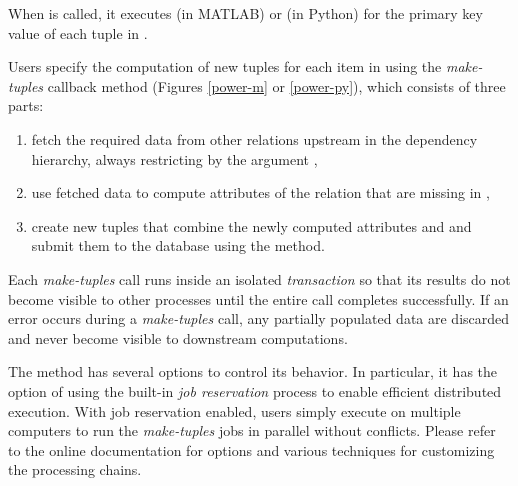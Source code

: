 When  is called, it executes   (in MATLAB) or  (in Python) for the primary key value  of each tuple in .

Users specify the computation of new tuples for each item in  using the \emph{make-tuples} callback method (Figures \ref{power-m} or \ref{power-py}),
which consists of three parts: 
\begin{enumerate}
\item fetch the required data from other relations upstream in the dependency hierarchy, always restricting by the argument ,
\item use fetched data to compute attributes of the relation that are missing in ,
\item create new tuples that combine the newly computed attributes and  and submit them to the database using the  method.
\end{enumerate}

Each \emph{make-tuples} call runs inside an isolated \emph{transaction} so that its results  do not become visible to other processes until the entire call completes successfully. 
If an error occurs during a \emph{make-tuples} call, any partially populated data are discarded and never become visible to downstream computations.

The  method has several options to control its behavior. 
In particular, it has the option of using the built-in \emph{job reservation} process to enable efficient distributed execution. 
With job reservation enabled, users simply execute  on multiple computers to run the \emph{make-tuples} jobs in parallel  without conflicts.
Please refer to the online documentation for  options and various techniques for customizing the processing chains.
